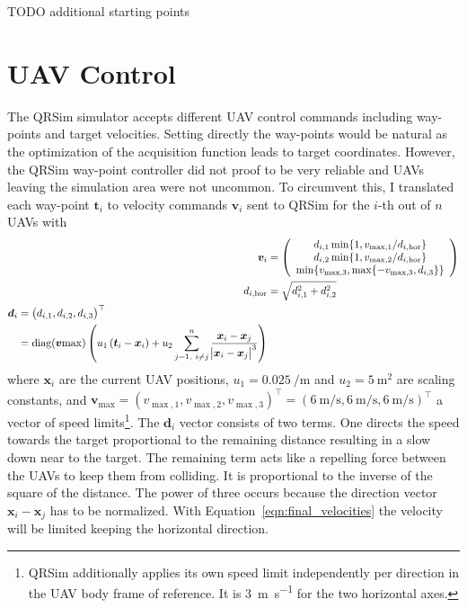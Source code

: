 \documentclass[11pt,a4paper,twoside,BCOR=15mm]{scrreprt}
\newcommand{\vc}[1]{\bm{#1}}
\newcommand{\Tr}{^{\top}}
\DeclareMathOperator{\diag}{diag}
\begin{document}
TODO additional starting points

\section{UAV Control}
The QRSim simulator accepts different UAV control commands including way-points 
and target velocities. Setting directly the way-points would be natural as the 
optimization of the acquisition function leads to target coordinates. However, 
the QRSim way-point controller did not proof to be very reliable and UAVs 
leaving the simulation area were not uncommon. To circumvent this, I translated 
each way-point $\vc t_i$ to velocity commands $\vc v_i$ sent to QRSim for the 
$i$-th out of $n$ UAVs with
\begin{align}
        \vc v_i &= \del{\begin{array}{c}
            d_{i, 1} \min\{1, v_{\max,1} / d_{i,\mathrm{hor}}\} \\
            d_{i, 2} \min\{1, v_{\max,2} / d_{i,\mathrm{hor}}\} \\
            \min\{v_{\max,3}, \max\{-v_{\max,3}, d_{i, 3}\}\}
        \end{array}} \label{eqn:final_velocities} \\
        d_{i,\mathrm{hor}} &= \sqrt{d_{i, 1}^2 + d_{i, 2}^2} \\
    \begin{split}
        \vc d_i &= \del{d_{i,1}, d_{i,2}, d_{i,3}}\Tr \\
        &= \diag(\vc v{\max}) \del{u_1 \del{\vc t_i - \vc x_i} + u_2 \sum_{j 
                = 1,\ i \neq j}^{n} \frac{\vc x_i - \vc x_j}{\abs{\vc x_i - \vc 
                    x_j}^3}}
    \end{split}
\end{align}
where $\vc x_i$ are the current UAV positions, $u_1 = \SI{0.025}{\per\meter}$ 
and $u_2 = \SI{5}{\meter\squared}$ are scaling constants, and $\vc v_{\max} 
= (v_{\max,1}, v_{\max,2}, v_{\max,3})\Tr = (\SI{6}{\meter\per\second}, 
\SI{6}{\meter\per\second}, \SI{6}{\meter\per\second})\Tr$ a vector of speed 
limits\footnote{QRSim additionally applies its own speed limit independently per 
    direction in the UAV body frame of reference. It is 
    \SI{3}{\meter\per\second} for the two horizontal axes.}.  The $\vc d_i$ 
vector consists of two terms.  One directs the speed towards the target 
proportional to the remaining distance resulting in a slow down near to the 
target. The remaining term acts like a repelling force between the UAVs to keep 
them from colliding.  It is proportional to the inverse of the square of the 
distance. The power of three occurs because the direction vector $\vc x_i - \vc 
x_j$ has to be normalized.  With Equation~\ref{eqn:final_velocities} the 
velocity will be limited keeping the horizontal direction.
\end{document}
